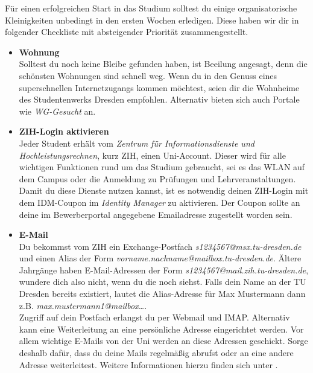 \newcommand{\checkbox}[1]{\item[$\square$]\textbf{#1}\\}


Für einen erfolgreichen Start in das Studium solltest du einige organisatorische
Kleinigkeiten unbedingt in den ersten Wochen erledigen. Diese haben wir dir in
folgender Checkliste mit absteigender Priorität zusammengestellt.

\begin{itemize}[leftmargin=*]

\checkbox{Wohnung}
Solltest du noch keine Bleibe gefunden haben, ist Beeilung angesagt, denn die
schönsten Wohnungen sind schnell weg. Wenn du in den Genuss eines
superschnellen Internetzugangs kommen möchtest, seien dir die Wohnheime
 des
Studentenwerks Dresden empfohlen. Alternativ bieten sich auch Portale wie
\textit{WG-Gesucht}  an.

\checkbox{ZIH-Login aktivieren}
Jeder Student erhält vom \textit{Zentrum für Informationsdienste und
Hochleistungsrechnen}, kurz ZIH, einen Uni-Account. Dieser wird für alle
wichtigen Funktionen rund um das Studium gebraucht, sei es das WLAN auf dem
Campus oder die Anmeldung zu Prüfungen und Lehrveranstaltungen. \\
Damit du diese Dienste nutzen kannst, ist es notwendig deinen ZIH-Login mit dem
IDM-Coupon im \textit{Identity Manager} 
zu aktivieren. Der Coupon sollte an deine im Bewerberportal angegebene
Emailadresse zugestellt worden sein.


\checkbox{E-Mail}
Du bekommst vom ZIH ein Exchange-Postfach \textit{s1234567@msx.tu-dresden.de}
und einen Alias der Form \textit{vorname.nachname@mailbox.tu-dresden.de}.
Ältere Jahrgänge haben E-Mail-Adressen der Form
\textit{s1234567\allowbreak{}@mail.zih.tu-dresden.de}, wundere dich also nicht,
wenn du die noch siehst. Falls dein Name an der TU Dresden bereits existiert,
lautet die Alias-Adresse für Max Mustermann dann z.B.
\textit{max.mustermann1@mailbox…}. \\
Zugriff auf dein Postfach erlangst du per Webmail und IMAP. Alternativ kann eine
Weiterleitung an eine persönliche Adresse eingerichtet werden. Vor allem
wichtige E-Mails von der Uni werden an diese Adressen geschickt. Sorge deshalb
dafür, dass du deine Mails regelmäßig abrufst oder an eine andere Adresse
weiterleitest. Weitere Informationen hierzu finden sich unter
.


\end{itemize}
